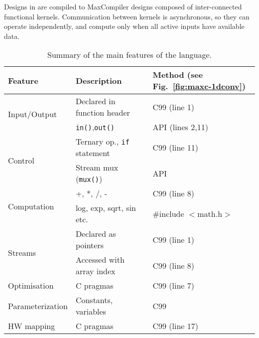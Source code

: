 Designs in \MAXC{} are compiled to MaxCompiler designs composed of
inter-connected functional kernels. Communication between kernels is
asynchronous, so they can operate independently, and compute only when
all active inputs have available data.

\begin{table}[!h]
  \centering
\renewcommand{\arraystretch}{1.6}
\caption{Summary of the main features of the \MAXC{} language.}
\label{table:maxc-features}
\begin{tabular}{l|l|l}
\hline
\bf{Feature}                   & \bf{Description}                   & \bf{Method (see Fig.~\ref{fig:maxc-1dconv})} \\
\hline\hline
  \multirow{2}{*}{Input/Output}         & Declared in function header          & C99 (line 1)                                 \\\cline{2-3}       & \texttt{in()},\texttt{out()}  & \MAXC{} API (lines 2,11) \\
\hline
  \multirow{2}{*}{Control}     & Ternary op., \texttt{if} statement & C99 (line 11)                                \\\cline{2-3}      & Stream mux (\texttt{mux()})       & \MAXC{} API  \\
\hline
\multirow{2}{*}{Computation} & +, *, /, -                         & C99 (line 8)                           \\\cline{2-3} & log, exp, sqrt, sin etc.  & \#include $<$math.h$>$  \\
\hline
  \multirow{2}{*}{Streams}     & Declared as pointers               & C99 (line 1)                                 \\\cline{2-3}       & Accessed with array index & C99 (line 8) \\
\hline
  Optimisation                 & C pragmas                   & C99 (line 7)                                 \\
\hline
  Parameterization             & Constants, variables                   & C99                                          \\
\hline
HW mapping                  & C pragmas                   & C99 (line 17)                                \\
\end{tabular}
\end{table}


